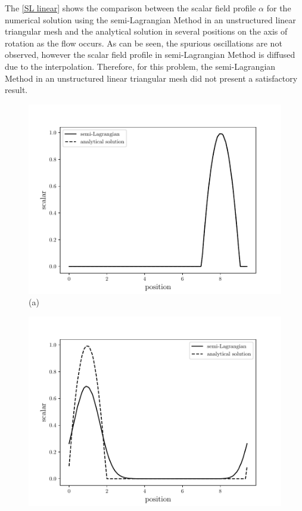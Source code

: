 \medskip
The \ref{SL linear} shows the comparison between the scalar field
profile $\alpha$ for the numerical solution using the semi-Lagrangian 
Method in an unstructured linear triangular mesh 
and the analytical solution in 
several positions on the axis of rotation as the flow occurs. 
As can be seen, the spurious oscillations are not observed,
however the scalar field profile in semi-Lagrangian Method
is diffused due to the interpolation. Therefore, for this problem,
the semi-Lagrangian Method in an unstructured linear triangular mesh
did not present a satisfactory result.


\begin{center}
\begin{figure}[H]
     \centering
     \begin{minipage}{.5\linewidth}
      \centering
      \includegraphics[scale=0.53]{./02_chaps/cap_validation/figure/SLlinear0.pdf}\\
      (a)
     \end{minipage}%
     \begin{minipage}{.5\linewidth}
      \centering
      \includegraphics[scale=0.53]{./02_chaps/cap_validation/figure/SLlinear1.pdf}\\

\end{minipage}
\end{figure}
\end{center}
